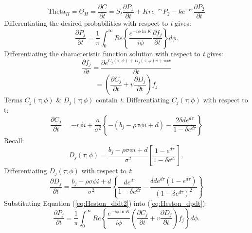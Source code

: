 \documentclass[a4paper]{article}
\begin{document}
\begin{equation}
	\mbox{Theta}_H = \Theta_H = \frac{\partial C}{\partial t} = S_t\frac{\partial P_1}{\partial t} + Kre^{-r\tau}P_2 - ke^{-r\tau}\frac{\partial P_2}{\partial t}
	\label{eq:Heston_theta_start}
\end{equation}
Differentiating the desired probabilities with respect to \textit{t} gives:
\begin{equation}
	\frac{\partial P_j}{\partial t} = \frac{1}{\pi}\int_0^{\infty} Re \left\{ \frac{e^{-i\phi \ln K}}{i\phi}\frac{\partial f_j}{\partial t} \right\} d\phi.
	\label{eq:Heston_dpdt}
\end{equation}
Differentiating the characteristic function solution with respect to \textit{t} gives:
\begin{equation}
\frac{\partial f_j}{\partial t} = \frac{\partial e^{C_j(\tau;\phi) + D_j(\tau;\phi)v + i\phi x}}{\partial t}
	\label{eq:Heston_dfdt}
\end{equation}
\begin{equation}
	= \left(\frac{\partial C_j}{\partial t} + v\frac{\partial D_j}{\partial t}\right)f_j
	\label{eq:Heston_dfdt2}
\end{equation}
Terms $C_j(\tau;\phi)$ \& $D_j(\tau;\phi)$ contain \textit{t}. Differentiating $C_j(\tau;\phi)$ with respect to t:
\begin{equation}
	\frac{\partial C_j}{\partial t} = -r\phi i + \frac{a}{\sigma^2} \left\{ -(b_j-\rho \sigma \phi i + d) - \frac{2\delta d e^{d\tau}}{1-\delta e^{d\tau}} \right\}
	\label{eq:Heston_dcdt}
\end{equation}
Recall:
\begin{equation*}
	D_j(\tau;\phi) = \frac{b_j - \rho \sigma \phi i + d}{\sigma^2} \left[ \frac{1 - e^{d\tau}}{1 - \delta e^{d\tau}} \right],
\end{equation*}
Differentiating $D_j(\tau;\phi)$ with respect to \textit{t}:
\begin{equation}
	\frac{\partial D_j}{\partial t} = \frac{b_j - \rho \sigma \phi i + d}{\sigma^2} \left\{ \frac{de^{d\tau}}{1-\delta e^{d\tau}} - \frac{\delta d e^{d\tau}(1-e^{d\tau})}{(1-\delta e^{d\tau})^2} \right\}
	\label{eq:Heston_dddt}
\end{equation}
Substituting Equation (\ref{eq:Heston_dfdt2}) into (\ref{eq:Heston_dpdt}):
\begin{equation}
	\frac{\partial P_j}{\partial t} = \frac{1}{\pi}\int_0^{\infty} Re \left\{ \frac{e^{-i\phi \ln K}}{i\phi} \left( \frac{\partial C_j}{\partial t} + v\frac{\partial D_j}{\partial t} \right) f_j \right\} d\phi.
	\label{eq:Heston_dpdt2}
\end{equation}
\end{document}

